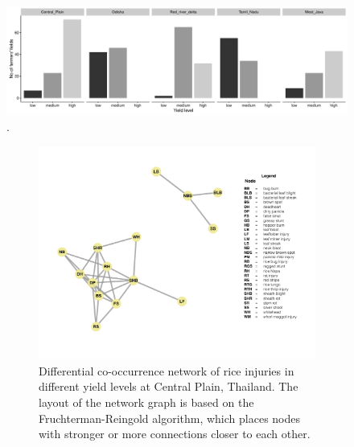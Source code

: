 \begin{figure}
    \centering
        \includegraphics[width = 1\textwidth]{figures/yield_level_bar.pdf}
        \caption{.}
        \label{fig: yield_level_bar}
\end{figure}

\begin{figure}
    \centering
    \begin{subfigure}[b]{1\textwidth}
        \includegraphics[width = 1\textwidth]{figures/difyieldCP.pdf}
        \caption{Differential co-occurrence network of rice injuries in different yield levels at Central Plain, Thailand. The layout of the network graph is based on the Fruchterman-Reingold algorithm, which places nodes with stronger or more connections closer to each other.}
        \label{fig:networkCP_ds}
    \end{subfigure}
    \begin{subfigure}[b]{1\textwidth}

\end{subfigure}
\end{figure}
